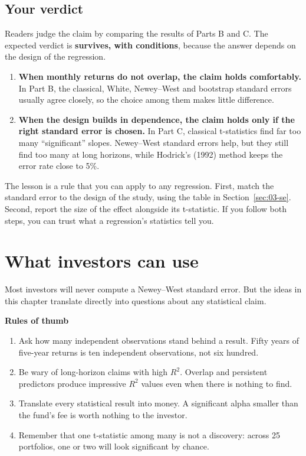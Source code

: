 \subsection*{Your verdict}

Readers judge the claim by comparing the results of Parts B and C. The expected verdict is \textbf{survives, with conditions}, because the answer depends on the design of the regression.

\begin{enumerate}
  \item \textbf{When monthly returns do not overlap, the claim holds comfortably.} In Part B, the classical, White, Newey--West and bootstrap standard errors usually agree closely, so the choice among them makes little difference.
  \item \textbf{When the design builds in dependence, the claim holds only if the right standard error is chosen.} In Part C, classical t-statistics find far too many ``significant'' slopes. Newey--West standard errors help, but they still find too many at long horizons, while Hodrick's (1992) method keeps the error rate close to 5\%.
\end{enumerate}

The lesson is a rule that you can apply to any regression. First, match the standard error to the design of the study, using the table in Section~\ref{sec:03-se}. Second, report the size of the effect alongside its t-statistic. If you follow both steps, you can trust what a regression's statistics tell you.



\section{What investors can use}
\label{sec:03-investors}

Most investors will never compute a Newey--West standard error. But the ideas in this chapter translate directly into questions about any statistical claim.

\textbf{Rules of thumb}

\begin{enumerate}
  \item Ask how many independent observations stand behind a result. Fifty years of five-year returns is ten independent observations, not six hundred.
  \item Be wary of long-horizon claims with high $R^2$. Overlap and persistent predictors produce impressive $R^2$ values even when there is nothing to find.
  \item Translate every statistical result into money. A significant alpha smaller than the fund's fee is worth nothing to the investor.
  \item Remember that one t-statistic among many is not a discovery: across 25 portfolios, one or two will look significant by chance.
\end{enumerate}

